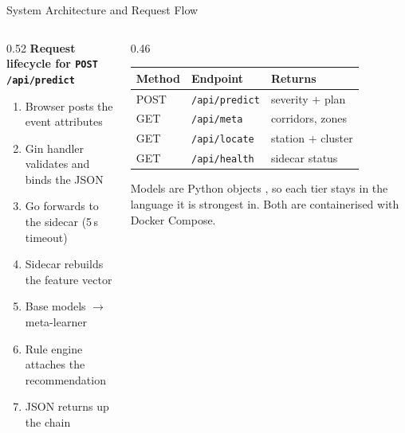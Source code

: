 \begin{frame}{System Architecture and Request Flow}
  \vspace{6mm}
  \begin{columns}[T]
    \begin{column}{0.52\textwidth}
      \textbf{\small Request lifecycle for \texttt{POST /api/predict}}
      \vspace{1mm}
      {\footnotesize
      \begin{enumerate}\itemsep1pt
        \item Browser posts the event attributes
        \item Gin handler validates and binds the JSON
        \item Go forwards to the sidecar (5\,s timeout)
        \item Sidecar rebuilds the feature vector
        \item Base models $\rightarrow$ meta-learner
        \item Rule engine attaches the recommendation
        \item JSON returns up the chain
      \end{enumerate}}
    \end{column}
    \begin{column}{0.46\textwidth}
      \footnotesize
      \setlength{\tabcolsep}{4pt}
      \begin{tabular}{llp{2.1cm}}
        \toprule
        Method & Endpoint & Returns \\
        \midrule
        POST & \texttt{/api/predict} & severity $+$ plan \\
        GET  & \texttt{/api/meta}    & corridors, zones \\
        GET  & \texttt{/api/locate}  & station $+$ cluster \\
        GET  & \texttt{/api/health}  & sidecar status \\
        \bottomrule
      \end{tabular}

      \vspace{2mm}
      {\scriptsize Models are Python objects , so each tier stays
      in the language it is strongest in. Both are containerised with Docker
      Compose.}
    \end{column}
  \end{columns}
\end{frame}

